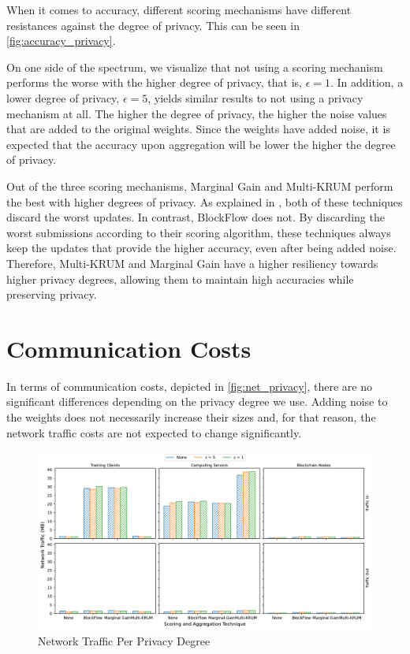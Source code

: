 When it comes to accuracy, different scoring mechanisms have different resistances against the degree of privacy. This can be seen in \autoref{fig:accuracy_privacy}.

On one side of the spectrum, we visualize that not using a scoring mechanism performs the worse with the higher degree of privacy, that is, $\epsilon = 1$. In addition, a lower degree of privacy, $\epsilon = 5$, yields similar results to not using a privacy mechanism at all. The higher the degree of privacy, the higher the noise values that are added to the original weights. Since the weights have added noise, it is expected that the accuracy upon aggregation will be lower the higher the degree of privacy.

Out of the three scoring mechanisms, Marginal Gain and Multi-KRUM perform the best with higher degrees of privacy. As explained in , both of these techniques discard the worst updates. In contrast, BlockFlow does not. By discarding the worst submissions according to their scoring algorithm, these techniques always keep the updates that provide the higher accuracy, even after being added noise. Therefore, Multi-KRUM and Marginal Gain have a higher resiliency towards higher privacy degrees, allowing them to maintain high accuracies while preserving privacy.

\section{Communication Costs}

In terms of communication costs, depicted in \autoref{fig:net_privacy}, there are no significant differences depending on the privacy degree we use. Adding noise to the weights does not necessarily increase their sizes and, for that reason, the network traffic costs are not expected to change significantly.

\begin{figure}[!h]
    \centering
    \includegraphics[width=\textwidth]{graphics/privacy/traffic.pdf}
    \caption{Network Traffic Per Privacy Degree}
    \label{fig:net_privacy}
\end{figure}

